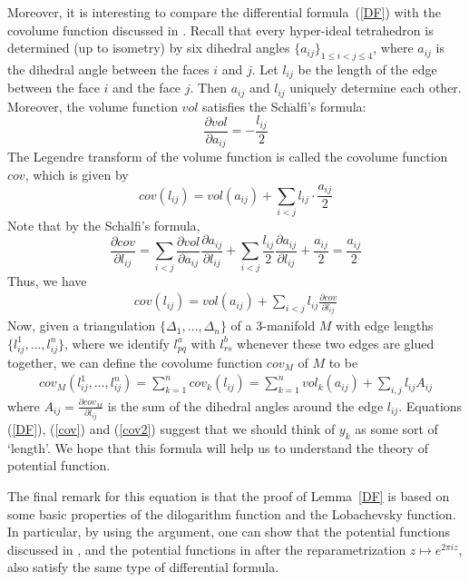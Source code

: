 \documentclass[10pt,a4paper]{article}
\begin{document}
Moreover, it is interesting to compare the differential formula~(\ref{DF}) with the covolume function discussed in \cite{LY18}. Recall that every hyper-ideal tetrahedron is determined (up to isometry) by six dihedral angles $\{a_{ij}\}_{1\leq i <j \leq 4}$, where $a_{ij}$ is the dihedral angle between the faces $i$ and $j$. Let $l_{ij}$ be the length of the edge between the face $i$ and the face $j$. Then $a_{ij}$ and $l_{ij}$ uniquely determine each other. Moreover, the volume function $vol$ satisfies the Sch$\ddot{\text{a}}$lfi's formula:
$$ \frac{\partial vol}{\partial a_{ij}} = - \frac{l_{ij}}{2}$$
The Legendre transform of the volume function is called the covolume function $cov$, which is given by \cite{LY18}
$$ cov (l_{ij}) = vol(a_{ij}) + \sum_{i<j } l_{ij} \cdot \frac{a_{ij}}{2} $$
Note that by the Sch$\ddot{\text{a}}$lfi's formula,
$$ \frac{\partial cov}{\partial l_{ij}} = \sum_{i<j}  \frac{\partial vol}{\partial a_{ij}}\frac{\partial a_{ij}}{\partial l_{ij}} + \sum_{i<j} \frac{l_{ij}}{2}\frac{\partial a_{ij}}{\partial l_{ij}} + \frac{a_{ij}}{2} = \frac{a_{ij}}{2}  $$
Thus, we have
\begin{align}\label{cov}
cov(l_{ij}) = vol(a_{ij}) + \sum_{i<j} l_{ij}\frac{\partial cov}{\partial l_{ij}} 
\end{align}
Now, given a triangulation $\{\Delta_1,\dots, \Delta_n\}$ of a 3-manifold $M$ with edge lengths $\{l^1_{ij},\dots,l^n_{ij}\}$, where we identify $l^a_{pq}$ with $l^b_{rs}$ whenever these two edges are glued together, we can define the covolume function $cov_M$ of $M$ to be
\begin{align}\label{cov2}
cov_M (l^1_{ij}, \dots, l^n_{ij}) = \sum_{k=1}^n cov_k (l_{ij}) = \sum_{k=1}^n vol_k(a_{ij}) + \sum_{i,j}  l_{ij} A_{ij}
\end{align}
where $A_{ij} = \frac{\partial cov_M}{\partial l_{ij}}$ is the sum of the dihedral angles around the edge $l_{ij}$. Equations (\ref{DF}), (\ref{cov}) and (\ref{cov2}) suggest that we should think of $y_k$ as some sort of `length'. We hope that this formula will help us to understand the theory of potential function.

The final remark for this equation is that the proof of Lemma~\ref{DF} is based on some basic properties of the dilogarithm function and the Lobachevsky function. In particular, by using the argument, one can show that the potential functions discussed in \cite{O52,O6,O7}, and the potential functions in \cite{KO05,CMY09} after the reparametrization $z \mapsto e^{2\pi i z}$, also satisfy the same type of differential formula. 
\end{document}
